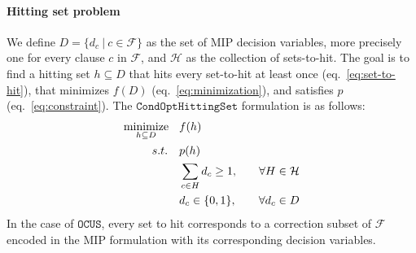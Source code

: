 \documentclass[a4paper,UKenglish,cleveref, autoref, thm-restate, pdfa]{lipics-v2021}
\DeclareMathOperator*{\mini}{minimize}
\newcommand\m[1]{\mathcal{#1}}
\renewcommand\comment[1]{}
\newcommand{\emilio}[1]{{\comment{\color{red}Emilio: #1}}}
\newcommand{\bart}[1]{{\comment{\color{OliveGreen}Bart: #1}}}
\newcommand\setstohit{\ensuremath{\m{H} }\xspace}
\newcommand\decisionvariables{{D}}
\newcommand\decisionvariable{{d}}
\newcommand\settohit{H}
\newcommand\hittingset{h}
\newcommand\formula{\ensuremath{\m{F} }\xspace}
\newcommand\mm[1]{\ensuremath{#1}\xspace}
\newcommand\call[1]{\mm{\texttt{#1}}}
\newcommand\cohs{\mm{\call{CondOptHittingSet}}}
\newcommand\comus{\mm{\call{OCUS}}}
\begin{document}
	\paragraph{Hitting set problem} We define $\decisionvariables = \{d_c \ | \ c \in \formula\}$ as the set of MIP decision variables, more precisely one for every clause $c$ in $\formula$, and $\setstohit$ as the collection of sets-to-hit. 
	The goal is to find a hitting set $\hittingset \subseteq D$ that hits every set-to-hit at least once (eq.~\ref{eq:set-to-hit}), that minimizes $f(D)$ (eq.~\ref{eq:minimization}), and satisfies $p$ (eq.~\ref{eq:constraint}).
	The \cohs formulation is as follows:
	\begin{eqnarray}
		\small
		\mini_{{\hittingset \subseteq \decisionvariables}} \quad & f(\hittingset) \label{eq:minimization}\\ 
		s.t. \quad & p(\hittingset) \label{eq:constraint}\\
		& \sum_{c\in \settohit}\decisionvariable_c \geq 1, \quad & \forall \settohit \in \setstohit \label{eq:set-to-hit}\\
		& \decisionvariable_c \in \{0,1\}, \quad  & \forall \decisionvariable_c \in \decisionvariables     \label{eq:decision-variables}
	\end{eqnarray}
	In the case of \comus, every set to hit corresponds to a correction subset of $\formula$ encoded in the MIP formulation with its corresponding decision variables. 
	\bart{What precisely is ``encoded in the MIP formulation''? Now it sounds like you are encoding that every H is is a correction subset, but that is certainly not what is going on. What is encoded is that you should hit every set in $\setstohit$, but that is not what this sentence is about.}
	\emilio{Added some clarifications on the link I wanted to make between the sets-to-hit and correction susbets that are computed}
	
\end{document}
